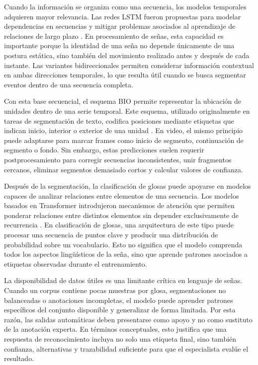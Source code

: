 Cuando la información se organiza como una secuencia, los modelos temporales adquieren mayor relevancia. Las redes LSTM fueron propuestas para modelar dependencias en secuencias y mitigar problemas asociados al aprendizaje de relaciones de largo plazo \cite{hochreiter1997lstm}. En procesamiento de señas, esta capacidad es importante porque la identidad de una seña no depende únicamente de una postura estática, sino también del movimiento realizado antes y después de cada instante. Las variantes bidireccionales permiten considerar información contextual en ambas direcciones temporales, lo que resulta útil cuando se busca segmentar eventos dentro de una secuencia completa.

Con esta base secuencial, el esquema BIO permite representar la ubicación de unidades dentro de una serie temporal. Este esquema, utilizado originalmente en tareas de segmentación de texto, codifica posiciones mediante etiquetas que indican inicio, interior o exterior de una unidad \cite{ramshaw1995text_chunking}. En video, el mismo principio puede adaptarse para marcar frames como inicio de segmento, continuación de segmento o fondo. Sin embargo, estas predicciones suelen requerir postprocesamiento para corregir secuencias inconsistentes, unir fragmentos cercanos, eliminar segmentos demasiado cortos y calcular valores de confianza.

Después de la segmentación, la clasificación de glosas puede apoyarse en modelos capaces de analizar relaciones entre elementos de una secuencia. Los modelos basados en Transformer introdujeron mecanismos de atención que permiten ponderar relaciones entre distintos elementos sin depender exclusivamente de recurrencia \cite{vaswani2017attention}. En clasificación de glosas, una arquitectura de este tipo puede procesar una secuencia de puntos clave y producir una distribución de probabilidad sobre un vocabulario. Esto no significa que el modelo comprenda todos los aspectos lingüísticos de la seña, sino que aprende patrones asociados a etiquetas observadas durante el entrenamiento.

La disponibilidad de datos útiles es una limitante crítica en lenguaje de señas. Cuando un corpus contiene pocas muestras por glosa, segmentaciones no balanceadas o anotaciones incompletas, el modelo puede aprender patrones específicos del conjunto disponible y generalizar de forma limitada. Por esta razón, las salidas automáticas deben presentarse como apoyo y no como sustituto de la anotación experta. En términos conceptuales, esto justifica que una respuesta de reconocimiento incluya no solo una etiqueta final, sino también confianza, alternativas y trazabilidad suficiente para que el especialista evalúe el resultado.

